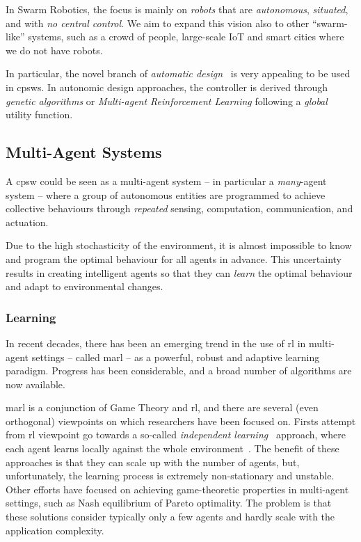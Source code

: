 \documentclass[11pt]{article}
\begin{document}
In Swarm Robotics, the focus is mainly on \textit{robots} that are \emph{autonomous}, \emph{situated}, and with \emph{no central control}. 
%
We aim to expand this vision also to other ``swarm-like'' systems, such as a crowd of people, large-scale IoT and smart cities where we do not have robots. 

In particular, the novel branch of \textit{automatic design}~\cite{DBLP:journals/firai/FrancescaB16} is very appealing to be used in \acp{cpsw}. 
%
In autonomic design approaches, the controller is derived through \textit{genetic algorithms} or \textit{Multi-agent Reinforcement Learning} following a \textit{global} utility function. 
\subsection{Multi-Agent Systems}
A \ac{cpsw} could be seen as a multi-agent system -- in particular a \emph{many}-agent system -- where a group of autonomous entities are programmed to achieve collective behaviours through \emph{repeated} sensing, computation, communication, and actuation.

Due to the high stochasticity of the environment, it is almost impossible to know and program the optimal behaviour for all agents in advance.
%
This uncertainty results in creating intelligent agents so that they can \emph{learn} the optimal behaviour and adapt to environmental changes.
\subsubsection{Learning}
In recent decades, there has been an emerging trend in the use of \ac{rl} 
in multi-agent settings -- called \ac{marl} -- as a powerful, robust and adaptive learning paradigm.
%
Progress has been considerable, and a broad number of algorithms are now available.

\ac{marl} is a conjunction of Game Theory and \ac{rl}, 
 and there are several (even orthogonal) viewpoints on which researchers have been focused on.
%
Firsts attempt from \ac{rl} viewpoint go towards a so-called \textit{independent learning}~\cite{DBLP:journals/tsmc/BusoniuBS08} approach, where each agent learns locally against the whole environment~\cite{DBLP:conf/icml/Tan93}.
%
The benefit of these approaches is that they can scale up with the number of agents, but, unfortunately, the learning process is extremely non-stationary and unstable.
%
Other efforts have focused on achieving game-theoretic properties in multi-agent settings, such as Nash equilibrium of Pareto optimality.
%
The problem is that these solutions consider typically only a few agents and hardly scale with the application complexity.
\end{document}
